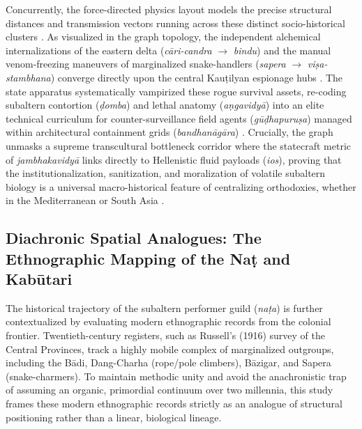 \documentclass[11pt,twoside,letterpaper]{article}
\begin{document}
Concurrently, the force-directed physics layout models the precise structural distances and transmission vectors running across these distinct socio-historical clusters \citep{Lorenzen2011}. As visualized in the graph topology, the independent alchemical internalizations of the eastern delta (\textit{c\={a}ri-candra} $\rightarrow$ \textit{bindu}) and the manual venom-freezing maneuvers of marginalized snake-handlers (\textit{sapera} $\rightarrow$ \textit{vi\d{s}a-stambhana}) converge directly upon the central Kau\d{t}ilyan espionage hubs \citep{Lorenzen2011, Mallinson2017}. The state apparatus systematically vampirized these rogue survival assets, re-coding subaltern contortion (\textit{\d{d}omba}) and lethal anatomy (\textit{a\d{n}gavidy\={a}}) into an elite technical curriculum for counter-surveillance field agents (\textit{g\={u}\d{d}hapuru\d{s}a}) managed within architectural containment grids (\textit{bandhan\={a}g\={a}ra}) \citep{McCartney2026}. Crucially, the graph unmasks a supreme transcultural bottleneck corridor where the statecraft metric of \textit{jambhakavidy\={a}} links directly to Hellenistic fluid payloads (\textit{ios}), proving that the institutionalization, sanitization, and moralization of volatile subaltern biology is a universal macro-historical feature of centralizing orthodoxies, whether in the Mediterranean or South Asia \citep{Debnath2024, Lorenzen2011, McCartney2021}.

\subsection{Diachronic Spatial Analogues: The Ethnographic Mapping of the Na\d{t} and Kab\={u}tari}
The historical trajectory of the subaltern performer guild (\textit{na\d{t}a}) is further contextualized by evaluating modern ethnographic records from the colonial frontier. Twentieth-century registers, such as Russell’s (1916) survey of the Central Provinces, track a highly mobile complex of marginalized outgroups, including the B\={a}di, Dang-Charha (rope/pole climbers), B\={a}zigar, and Sapera (snake-charmers). To maintain methodic unity and avoid the anachronistic trap of assuming an organic, primordial continuum over two millennia, this study frames these modern ethnographic records strictly as an analogue of structural positioning rather than a linear, biological lineage.
\end{document}
